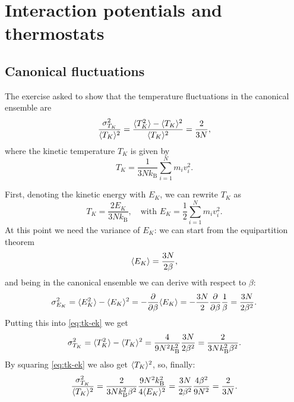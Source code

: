 \chapter{Interaction potentials and thermostats}

\section{Canonical fluctuations}\label{ex:101}

The exercise asked to show that the temperature fluctuations in the canonical
ensemble are
\begin{equation}
  \frac{\sigma_{T_{K}}^{2}}{\langle T_{K}\rangle^{2}} = \frac{\langle T_{K}^{2}\rangle -
  \langle T_{K}\rangle^{2}}{\langle T_{K}\rangle^{2}} = \frac{2}{3N},
  \label{eq:sigmaTK-def}
\end{equation}
where the kinetic temperature $T_{K}$ is given by
\begin{equation}
  T_{K} = \frac{1}{3N k_{\mathrm{B}}} \sum_{i=1}^{N} m_{i} v_{i}^{2}.
\end{equation}

First, denoting the kinetic energy with $E_{K}$, we can rewrite $T_{K}$ as
\begin{equation}
  T_{K} = \frac{2E_{K}}{3N k_{\mathrm{B}}}, \quad \text{with }
  E_{K} = \frac{1}{2} \sum_{i=1}^{N} m_{i} v_{i}^{2}.
  \label{eq:tk-ek}
\end{equation}
At this point we need the variance of $E_{K}$: we can start from the
equipartition theorem
\begin{equation}
  \langle E_{K}\rangle = \frac{3N}{2 \beta},
\end{equation}
and being in the canonical ensemble we can derive with respect to $\beta$:
\begin{equation}
  \sigma_{E_{K}}^{2} = \expval{E_{K}^{2}} - \expval{E_{K}}^{2} =
  -\pdiff{}{\beta} \expval{E_{K}} = -\frac{3N}{2} \pdiff{}{\beta}\frac{1}{\beta}
  = \frac{3N}{2 \beta^{2}}.
\end{equation}
Putting this into \cref{eq:tk-ek} we get
\begin{equation}
  \sigma_{T_{K}}^{2} = \langle T_{K}^{2}\rangle - \langle T_{K}\rangle^{2} =
  \frac{4}{9N^{2} k_{\mathrm{B}}^{2}} \frac{3N}{2 \beta^{2}} = \frac{2}{3N
  k_{\mathrm{B}}^{2} \beta^{2}}.
\end{equation}
By squaring \cref{eq:tk-ek} we also get $\langle T_{K}\rangle^{2}$, so, finally:
\begin{equation}
  \frac{\sigma_{T_{K}}^{2}}{\langle T_{K}\rangle^{2}} = \frac{2}{3N k_{\mathrm{B}}^{2}
  \beta^{2}} \frac{9 N^{2} k_{\mathrm{B}}^{2}}{4 \langle E_{K}\rangle^{2}} =
  \frac{3N}{2 \beta^{2}} \frac{4 \beta^{2}}{9 N^{2}} = \frac{2}{3N}.
\end{equation}

